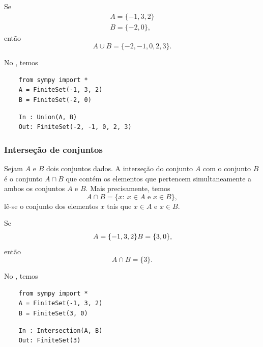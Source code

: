 \begin{ex}
  Se
  \begin{gather}
    A = \{-1, 3, 2\}\\
    B = \{-2, 0\},
  \end{gather}
  então
  \begin{equation}
    A\cup B = \{-2, -1, 0, 2, 3\}.
  \end{equation}

  \ifispython
  No \python, temos
  \begin{lstlisting}
    from sympy import *
    A = FiniteSet(-1, 3, 2)
    B = FiniteSet(-2, 0)
  \end{lstlisting}
  \begin{lstlisting}
    In : Union(A, B)
    Out: FiniteSet(-2, -1, 0, 2, 3)
  \end{lstlisting}
  \fi
\end{ex}

\subsubsection{Interseção de conjuntos}

Sejam $A$ e $B$ dois conjuntos dados. A interseção do conjunto $A$ com o conjunto $B$ é o conjunto $A\cap B$ que contém os elementos que pertencem simultaneamente a ambos os conjuntos $A$ e $B$. Mais precisamente, temos
\begin{equation}
  A\cap B = \{x:~x\in A \text{ e } x\in B\},
\end{equation}
lê-se o conjunto dos elementos $x$ tais que $x\in A$ e $x\in B$.

\begin{ex}
  Se
  \begin{equation}
    A = \{-1, 3, 2\}\\
    B = \{3, 0\},
  \end{equation}
  então
  \begin{equation}
    A\cap B = \{3\}.
  \end{equation}

  \ifispython
  No \python, temos
  \begin{lstlisting}
    from sympy import *
    A = FiniteSet(-1, 3, 2)
    B = FiniteSet(3, 0)
  \end{lstlisting}
  \begin{lstlisting}
    In : Intersection(A, B)
    Out: FiniteSet(3)
  \end{lstlisting}
  \fi
\end{ex}

